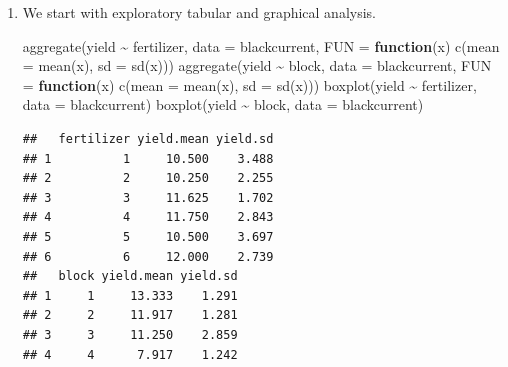 \documentclass[
]{book}
\newenvironment{Shaded}{\begin{snugshade}}{\end{snugshade}}
\newcommand{\AttributeTok}[1]{\textcolor[rgb]{0.77,0.63,0.00}{#1}}
\newcommand{\ControlFlowTok}[1]{\textcolor[rgb]{0.13,0.29,0.53}{\textbf{#1}}}
\newcommand{\FunctionTok}[1]{\textcolor[rgb]{0.00,0.00,0.00}{#1}}
\newcommand{\NormalTok}[1]{#1}
\newcommand{\SpecialCharTok}[1]{\textcolor[rgb]{0.00,0.00,0.00}{#1}}
\theoremstyle{definition}
\theoremstyle{definition}
\theoremstyle{definition}
\theoremstyle{definition}
\theoremstyle{remark}
\begin{document}
\begin{enumerate}
\def\labelenumi{\alph{enumi}.}
\item
  We start with exploratory tabular and graphical analysis.

\begin{Shaded}
\begin{Highlighting}[]
\FunctionTok{aggregate}\NormalTok{(yield }\SpecialCharTok{\textasciitilde{}}\NormalTok{ fertilizer, }\AttributeTok{data =}\NormalTok{ blackcurrent, }
          \AttributeTok{FUN =} \ControlFlowTok{function}\NormalTok{(x) }\FunctionTok{c}\NormalTok{(}\AttributeTok{mean =} \FunctionTok{mean}\NormalTok{(x), }\AttributeTok{sd =} \FunctionTok{sd}\NormalTok{(x)))}
\FunctionTok{aggregate}\NormalTok{(yield }\SpecialCharTok{\textasciitilde{}}\NormalTok{ block, }\AttributeTok{data =}\NormalTok{ blackcurrent, }
          \AttributeTok{FUN =} \ControlFlowTok{function}\NormalTok{(x) }\FunctionTok{c}\NormalTok{(}\AttributeTok{mean =} \FunctionTok{mean}\NormalTok{(x), }\AttributeTok{sd =} \FunctionTok{sd}\NormalTok{(x)))}
\FunctionTok{boxplot}\NormalTok{(yield }\SpecialCharTok{\textasciitilde{}}\NormalTok{ fertilizer, }\AttributeTok{data =}\NormalTok{ blackcurrent)}
\FunctionTok{boxplot}\NormalTok{(yield }\SpecialCharTok{\textasciitilde{}}\NormalTok{ block, }\AttributeTok{data =}\NormalTok{ blackcurrent)}
\end{Highlighting}
\end{Shaded}

\begin{verbatim}
##   fertilizer yield.mean yield.sd
## 1          1     10.500    3.488
## 2          2     10.250    2.255
## 3          3     11.625    1.702
## 4          4     11.750    2.843
## 5          5     10.500    3.697
## 6          6     12.000    2.739
##   block yield.mean yield.sd
## 1     1     13.333    1.291
## 2     2     11.917    1.281
## 3     3     11.250    2.859
## 4     4      7.917    1.242
\end{verbatim}

  \begin{figure}


\end{figure}
\end{enumerate}
\end{document}

